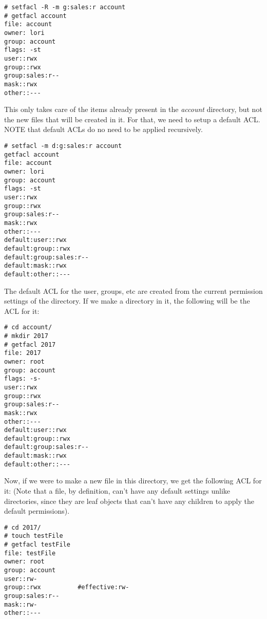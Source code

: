 \vspace{-15pt}
\begin{verbatim}
# setfacl -R -m g:sales:r account
# getfacl account
file: account
owner: lori
group: account
flags: -st
user::rwx
group::rwx
group:sales:r--
mask::rwx
other::---
\end{verbatim}
\vspace{-10pt}

\noindent
This only takes care of the items already present in the \textit{account} directory, but not the new files that will be created in it. For that, we need to setup a default ACL. NOTE that default ACLs do no need to be applied recursively. 

\vspace{-15pt}
\begin{verbatim}
# setfacl -m d:g:sales:r account
getfacl account
file: account
owner: lori
group: account
flags: -st
user::rwx
group::rwx
group:sales:r--
mask::rwx
other::---
default:user::rwx
default:group::rwx
default:group:sales:r--
default:mask::rwx
default:other::---
\end{verbatim}
\vspace{-10pt}

\noindent
The default ACL for the user, groups, etc are created from the current permission settings of the directory. If we make a directory in it, the following will be the ACL for it:

\vspace{-15pt}
\begin{verbatim}
# cd account/
# mkdir 2017
# getfacl 2017
file: 2017
owner: root
group: account
flags: -s-
user::rwx
group::rwx
group:sales:r--
mask::rwx
other::---
default:user::rwx
default:group::rwx
default:group:sales:r--
default:mask::rwx
default:other::---
\end{verbatim}
\vspace{-10pt}

\noindent
Now, if we were to make a new file in this directory, we get the following ACL for it: (Note that a file, by definition, can't have any default settings unlike directories, since they are leaf objects that can't have any children to apply the default permissions).

\vspace{-15pt}
\begin{verbatim}
# cd 2017/
# touch testFile
# getfacl testFile 
file: testFile
owner: root
group: account
user::rw-
group::rwx			#effective:rw-
group:sales:r--
mask::rw-
other::---
\end{verbatim}
\vspace{-10pt}

